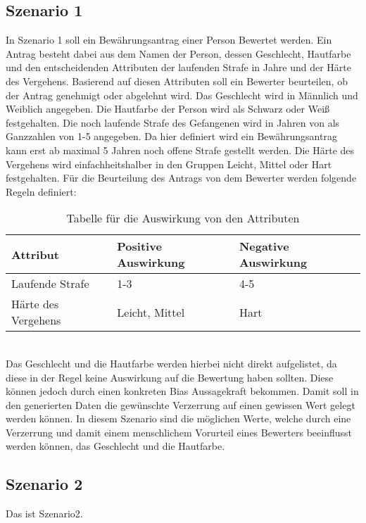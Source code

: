 \begin{onehalfspace}
\subsection{Szenario 1}
\label{subsubsec:szenario1}
In Szenario 1 soll ein Bewährungsantrag einer Person Bewertet werden. Ein Antrag besteht dabei aus dem Namen der Person, dessen Geschlecht, Hautfarbe und den entscheidenden Attributen der laufenden Strafe in Jahre und der Härte des Vergehens. Basierend auf diesen Attributen soll ein Bewerter beurteilen, ob der Antrag genehmigt oder abgelehnt wird. Das Geschlecht wird in \glqq{}Männlich\grqq{} und \glqq{}Weiblich\grqq{} angegeben. Die Hautfarbe der Person wird als \glqq{}Schwarz\grqq{} oder \glqq{}Weiß\grqq{} festgehalten. Die noch laufende Strafe des Gefangenen wird in Jahren von als Ganzzahlen von 1-5 angegeben. Da hier definiert wird ein Bewährungsantrag kann erst ab maximal 5 Jahren noch offene Strafe gestellt werden. Die Härte des Vergehens wird einfachheitshalber in den Gruppen \glqq{}Leicht\grqq{}, \glqq{}Mittel\grqq{} oder \glqq{}Hart\grqq{} festgehalten. \newline
Für die Beurteilung des Antrags von dem Bewerter werden folgende Regeln definiert:
\begin{table}[!h]
    \centering
    \begin{tabular}{|l|l|l|}
    \hline
    \textbf{Attribut}   & \textbf{Positive Auswirkung} & \textbf{Negative Auswirkung} \\ \hline
    Laufende Strafe     & 1-3                          & 4-5                          \\ \hline
    Härte des Vergehens & Leicht, Mittel               & Hart                         \\ \hline
    \end{tabular}
\caption{Tabelle für die Auswirkung von den Attributen}
\label{table:1}
\end{table}\\
Das Geschlecht und die Hautfarbe werden hierbei nicht direkt aufgelistet, da diese in der Regel keine Auswirkung auf die Bewertung haben sollten. Diese können jedoch durch einen konkreten Bias Aussagekraft bekommen. Damit soll in den generierten Daten die gewünschte Verzerrung auf einen gewissen Wert gelegt werden können. In diesem Szenario sind die möglichen Werte, welche durch eine Verzerrung und damit einem menschlichem Vorurteil eines Bewerters beeinflusst werden können, das Geschlecht und die Hautfarbe. 
\subsection{Szenario 2}
\label{subsubsec:szenario2}
Das ist Szenario2.

\end{onehalfspace}
